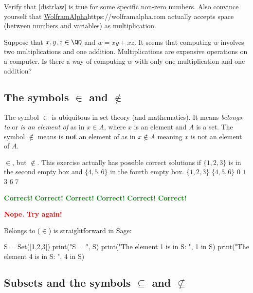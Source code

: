 \documentclass{article}
\newcommand{\red}[1]{\textcolor{red}{\textbf{#1}}}
\newcommand{\green}[1]{\textcolor{green}{\textbf{#1}}}
\begin{document}
\beginshex
Verify that \eqref{distrlaw} is true for some specific non-zero numbers. Also
convince yourself that \url{WolframAlpha}{https://wolframalpha.com} actually
accepts space (between numbers and variables) as multiplication.
\endshex

\beginshex
Suppose that $x, y, z\in \QQ$ and $w = x y + x z$. It seems
that computing $w$ involves two multiplications and one addition. Multiplications are
expensive operations on a computer. Is there a way of computing
$w$ with only one multiplication and one addition?
\endshex

\subsection{The symbols $\in$ and $\notin$}

The symbol $\in$ is ubiquitous in set theory (and mathematics). 
It means \emph{belongs to} or \emph{is an element of} as in 
$x\in A$, where $x$ is an element and $A$ is a set. The symbol
$\notin$ means is \textbf{not} an element of as in
$x\notin A$ meaning $x$ is not an element of $A$.


\begin{quizexercise}[showhide]
\begin{paraquiz}
  \question
  \box$\in$\box, but \box$\not\in$\box. This exercise actually has \box possible correct solutions
if $\{1, 2, 3\}$ is in the second empty box and $\{4, 5, 6\}$ in the fourth empty box.
  \answer
  $\{1, 2, 3\}$
  \answer
  $\{4, 5, 6\}$
  \answer
  $0$
  \answer
  $1$
  \answer
  $3$
  \answer
  $6$
  \answer
  $7$

  \green{Correct!}
  \green{Correct!}
  \green{Correct!}
  \green{Correct!}
  \green{Correct!}
  \green{Correct!}

  \red{Nope. Try again!}
\end{paraquiz}
\end{quizexercise}


Belongs to ($\in$) is straightforward in Sage:

\begin{sage}
S = Set([1,2,3])
print("S = ", S)
print("The element 1 is in S: ", 1 in S)
print("The element 4 is in S: ", 4 in S)
\end{sage}




\subsection{Subsets and the symbols $\subseteq$ and $\not\subseteq$}
\end{document}
